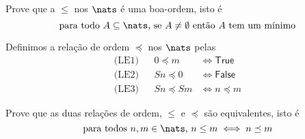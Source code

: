 \begin{exercise}
    Prove que a $\leq$ nos $\nats$ \'e uma boa-ordem, isto \'e
    $$
    \text{para todo $A \subseteq \nats$, se $A \neq \emptyset$ ent\~ao $A$ tem
        um m\'inimo}
    $$
\end{exercise}

\begin{definition}
    Definimos a rela\c c\~ao de ordem $\preceq$ nos $\nats$ pelas
    \begin{align*}
        \text{(LE1)} && 0 \preceq m   &\iff \mathsf{True} \\
        \text{(LE2)} && Sn \preceq 0  &\iff \mathsf{False} \\
        \text{(LE3)} && Sn \preceq Sm &\iff n \preceq m
    \end{align*}
\end{definition}

\begin{exercise}
    Prove que as duas rela\c c\~oes de ordem, $\leq$ e $\preceq$ s\~ao
    equivalentes, isto \'e
    $$
    \text{para todos $n,m \in \nats$, } n \leq m \iff n \preceq m
    $$
\end{exercise}
